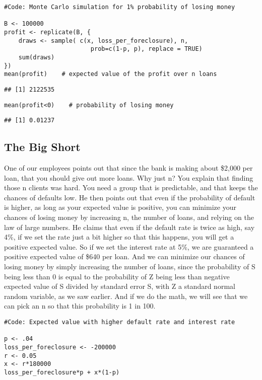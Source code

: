 \documentclass[
]{article}
\begin{document}
\begin{verbatim}
#Code: Monte Carlo simulation for 1% probability of losing money

B <- 100000
profit <- replicate(B, {
    draws <- sample( c(x, loss_per_foreclosure), n, 
                        prob=c(1-p, p), replace = TRUE) 
    sum(draws)
})
mean(profit)    # expected value of the profit over n loans
\end{verbatim}

\begin{verbatim}
## [1] 2122535
\end{verbatim}

\begin{verbatim}
mean(profit<0)    # probability of losing money
\end{verbatim}

\begin{verbatim}
## [1] 0.01237
\end{verbatim}

\hypertarget{the-big-short}{%
\subsection{The Big Short}\label{the-big-short}}

One of our employees points out that since the bank is making about
\$2,000 per loan, that you should give out more loans. Why just n? You
explain that finding those n clients was hard. You need a group that is
predictable, and that keeps the chances of defaults low. He then points
out that even if the probability of default is higher, as long as your
expected value is positive, you can minimize your chances of losing
money by increasing n, the number of loans, and relying on the law of
large numbers. He claims that even if the default rate is twice as high,
say 4\%, if we set the rate just a bit higher so that this happens, you
will get a positive expected value. So if we set the interest rate at
5\%, we are guaranteed a positive expected value of \$640 per loan. And
we can minimize our chances of losing money by simply increasing the
number of loans, since the probability of S being less than 0 is equal
to the probability of Z being less than negative expected value of S
divided by standard error S, with Z a standard normal random variable,
as we saw earlier. And if we do the math, we will see that we can pick
an n so that this probability is 1 in 100.

\begin{verbatim}
#Code: Expected value with higher default rate and interest rate

p <- .04
loss_per_foreclosure <- -200000
r <- 0.05
x <- r*180000
loss_per_foreclosure*p + x*(1-p)
\end{verbatim}
\end{document}
